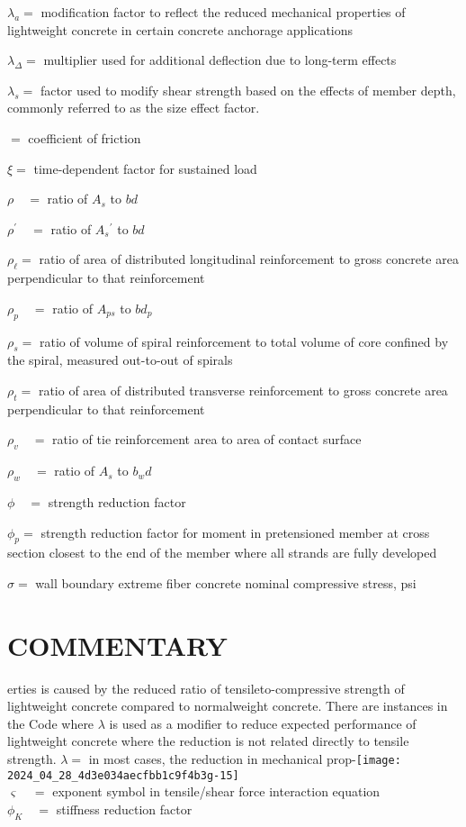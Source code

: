 \documentclass[10pt]{article}
\begin{document}
$\lambda_{a}=$ modification factor to reflect the reduced mechanical properties of lightweight concrete in certain concrete anchorage applications

$\lambda_{\Delta}=$ multiplier used for additional deflection due to long-term effects

$\lambda_{s}=$ factor used to modify shear strength based on the effects of member depth, commonly referred to as the size effect factor.

$=$ coefficient of friction

$\xi=$ time-dependent factor for sustained load

$\rho \quad=$ ratio of $A_{s}$ to $b d$

$\rho^{\prime} \quad=$ ratio of $A_{s}{ }^{\prime}$ to $b d$

$\rho_{\ell}=$ ratio of area of distributed longitudinal reinforcement to gross concrete area perpendicular to that reinforcement

$\rho_{p} \quad=$ ratio of $A_{p s}$ to $b d_{p}$

$\rho_{s}=$ ratio of volume of spiral reinforcement to total volume of core confined by the spiral, measured out-to-out of spirals

$\rho_{t}=$ ratio of area of distributed transverse reinforcement to gross concrete area perpendicular to that reinforcement

$\rho_{v} \quad=$ ratio of tie reinforcement area to area of contact surface

$\rho_{w} \quad=$ ratio of $A_{s}$ to $b_{w} d$

$\phi \quad=$ strength reduction factor

$\phi_{p}=$ strength reduction factor for moment in pretensioned member at cross section closest to the end of the member where all strands are fully developed

$\sigma=$ wall boundary extreme fiber concrete nominal compressive stress, psi

\section*{COMMENTARY}
 erties is caused by the reduced ratio of tensileto-compressive strength of lightweight concrete compared to normalweight concrete. There are instances in the Code where $\lambda$ is used as a modifier to reduce expected performance of lightweight concrete where the reduction is not related directly to tensile strength. $\lambda=$ in most cases, the reduction in mechanical prop-\texttt{[image: 2024\_04\_28\_4d3e034aecfbb1c9f4b3g-15]}\\
$\varsigma \quad=$ exponent symbol in tensile/shear force interaction equation\\
$\phi_{K} \quad=$ stiffness reduction factor
\end{document}

